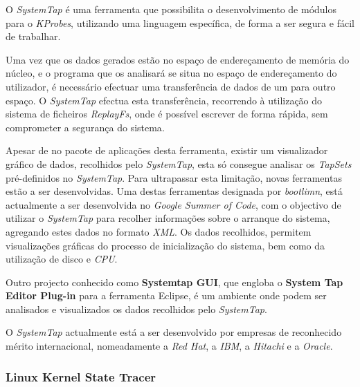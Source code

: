
O \textit{SystemTap} é uma ferramenta que possibilita o desenvolvimento de módulos para o \textit{KProbes}, utilizando uma linguagem específica, de forma a ser segura e fácil de trabalhar.

Uma vez que os dados gerados estão no espaço de endereçamento de memória do núcleo, e o programa que os analisará se situa no espaço de endereçamento do utilizador, é necessário efectuar uma transferência de dados de um para outro espaço.
O \textit{SystemTap} efectua esta transferência, recorrendo à utilização do sistema de ficheiros \textit{ReplayFs}, onde é possível escrever de forma rápida, sem comprometer a segurança do sistema\cite{Donovan2007,Jones2009}.

Apesar de no pacote de aplicações desta ferramenta, existir um visualizador gráfico de dados, recolhidos pelo \textit{SystemTap}, esta só consegue analisar os \textit{TapSets} pré-definidos no \textit{SystemTap}.
Para ultrapassar esta limitação, novas ferramentas estão a ser desenvolvidas.
Uma destas ferramentas designada por \textit{bootlimn}, está actualmente a ser desenvolvida no \textit{Google Summer of Code}, com o objectivo de utilizar o \textit{SystemTap} para recolher informações sobre o arranque do sistema, agregando estes dados no formato \textit{XML}.
Os dados recolhidos, permitem visualizações gráficas do processo de inicialização do sistema, bem como da utilização de disco e \textit{CPU}.

Outro projecto conhecido como \textbf{Systemtap GUI}, que engloba o \textbf{System Tap Editor Plug-in} para a ferramenta Eclipse, é um ambiente onde podem ser analisados e visualizados os dados recolhidos pelo \textit{SystemTap}.

O \textit{SystemTap} actualmente está a ser desenvolvido por empresas de reconhecido mérito internacional, nomeadamente a \textit{Red Hat}, a \textit{IBM}, a \textit{Hitachi} e a \textit{Oracle}.

\subsubsection{Linux Kernel State Tracer}

